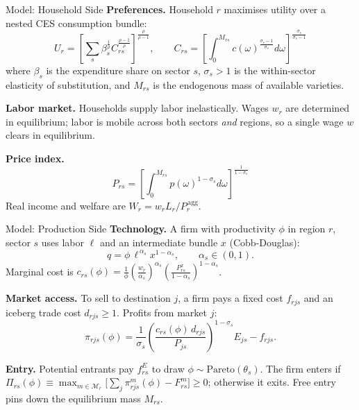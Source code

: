 \documentclass[aspectratio=169,10pt]{beamer}
\begin{document}
\begin{frame}{Model: Household Side}
\small
\textbf{Preferences.} Household $r$ maximises utility over a nested CES consumption bundle:
\[
U_r = \left[\sum_{s} \beta_s^{\frac{1}{\rho}} C_{rs}^{\frac{\rho-1}{\rho}}\right]^{\frac{\rho}{\rho-1}},
\qquad
C_{rs} = \left[\int_0^{M_{rs}} c(\omega)^{\frac{\sigma_s-1}{\sigma_s}} d\omega\right]^{\frac{\sigma_s}{\sigma_s-1}}
\]
where $\beta_s$ is the expenditure share on sector $s$, $\sigma_s>1$ is the within-sector elasticity of substitution, and $M_{rs}$ is the endogenous mass of available varieties.

\vspace{0.5em}
\textbf{Labor market.} Households supply labor inelastically. Wages $w_r$ are determined in equilibrium; labor is mobile across both sectors \emph{and} regions, so a single wage $w$ clears in equilibrium.

\vspace{0.5em}
\textbf{Price index.}
\[
P_{rs} = \left[\int_0^{M_{rs}} p(\omega)^{1-\sigma_s} d\omega\right]^{\frac{1}{1-\sigma_s}}
\]
Real income and welfare are $W_r = w_r L_r / P_r^{\,\text{agg}}$.
\end{frame}

\begin{frame}{Model: Production Side}
\small
\textbf{Technology.} A firm with productivity $\phi$ in region $r$, sector $s$ uses labor $\ell$ and an intermediate bundle $x$ (Cobb-Douglas):
\[
q = \phi \,\ell^{\,\alpha_s} x^{1-\alpha_s}, \qquad \alpha_s \in (0,1).
\]
Marginal cost is $c_{rs}(\phi) = \frac{1}{\phi}\left(\frac{w_r}{\alpha_s}\right)^{\alpha_s}\!\left(\frac{P^x_{rs}}{1-\alpha_s}\right)^{1-\alpha_s}$.

\vspace{0.5em}
\textbf{Market access.} To sell to destination $j$, a firm pays a fixed cost $f_{rjs}$ and an iceberg trade cost $d_{rjs}\geq 1$. Profits from market $j$:
\[
\pi_{rjs}(\phi) = \frac{1}{\sigma_s}\left(\frac{c_{rs}(\phi)\,d_{rjs}}{P_{js}}\right)^{1-\sigma_s} \!E_{js} - f_{rjs}.
\]

\vspace{0.5em}
\textbf{Entry.} Potential entrants pay $f^E_{rs}$ to draw $\phi\sim\text{Pareto}(\theta_s)$. The firm enters if $\Pi_{rs}(\phi)\equiv \max_{m\in\mathcal{M}_r}\bigl[\sum_j \pi^m_{rjs}(\phi) - F^m_{rs}\bigr]\geq 0$; otherwise it exits. Free entry pins down the equilibrium mass $M_{rs}$.
\end{frame}
\end{document}

